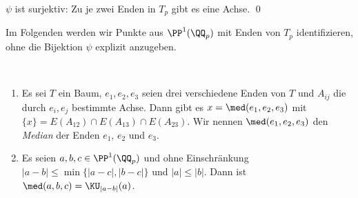 $\psi$ ist surjektiv: Zu je zwei Enden in $T_p$ gibt es eine Achse.
\qed

Im Folgenden werden wir Punkte aus $\PP^1(\QQ_p)$ mit
Enden von $T_p$ identifizieren, ohne die Bijektion 
$\psi$ explizit anzugeben.

\DB\ \label{bem_median}
\begin{enumerate}
\item Es sei $T$ ein Baum, $e_1,e_2,e_3$ seien drei verschiedene
Enden von $T$ und $A_{ij}$ die durch $e_i,e_j$ bestimmte Achse.
Dann gibt es $x=\med(e_1,e_2,e_3)$ mit
$\{x\}=E(A_{12})\cap E(A_{13})\cap E(A_{23})$.
Wir nennen $\med(e_1,e_2,e_3)$ den \emph{Median}
der Enden $e_1$, $e_2$ und $e_3$.
\item Es seien $a,b,c\in\PP^1(\QQ_p)$ und ohne Einschränkung
$|a-b|\leq\min\{|a-c|,|b-c|\}$ und $|a|\leq |b|$.
Dann ist $\med(a,b,c)=\KU_{|a-b|}(a)$.
\end{enumerate}

